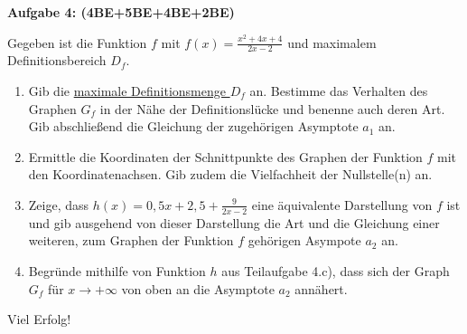 \documentclass[a4paper,12pt]{article}
\newcommand{\Aufgabe}[1]{
  {
  \vspace*{0.5cm}
  \textsf{\textbf{Aufgabe #1}}
  \vspace*{0.2cm}
  
  }
}
\begin{document}
\Aufgabe{4: (4BE+5BE+4BE+2BE)}
Gegeben ist die Funktion $f$ mit $f(x)=\frac{x^2+4x+4}{2x-2}$ und maximalem Definitionsbereich $D_f$.
\begin{enumerate}[label={\alph*)}, topsep=5pt,itemsep=4ex,partopsep=1ex,parsep=1ex]
  \item Gib die \underline{maximale Definitionsmenge $D_f$} an. Bestimme das Verhalten des Graphen $G_f$ in der Nähe der Definitionslücke und benenne auch deren Art. Gib abschließend die Gleichung der zugehörigen Asymptote $a_1$ an.
  \item Ermittle die Koordinaten der Schnittpunkte des Graphen der Funktion $f$ mit den Koordinatenachsen. Gib zudem die Vielfachheit der Nullstelle(n) an.
  \item Zeige, dass $h(x)=0,5x+2,5+\frac{9}{2x-2}$ eine äquivalente Darstellung von $f$ ist und gib ausgehend von dieser Darstellung die Art und die Gleichung einer weiteren, zum Graphen der Funktion $f$ gehörigen Asympote $a_2$ an.
  \item Begründe mithilfe von Funktion $h$ aus Teilaufgabe 4.c), dass sich der Graph $G_f$ für $x\rightarrow +\infty$ von oben an die Asymptote $a_2$ annähert.
\end{enumerate}

\vspace{5mm}
\begin{center}
Viel Erfolg!
\end{center}
\end{document}
